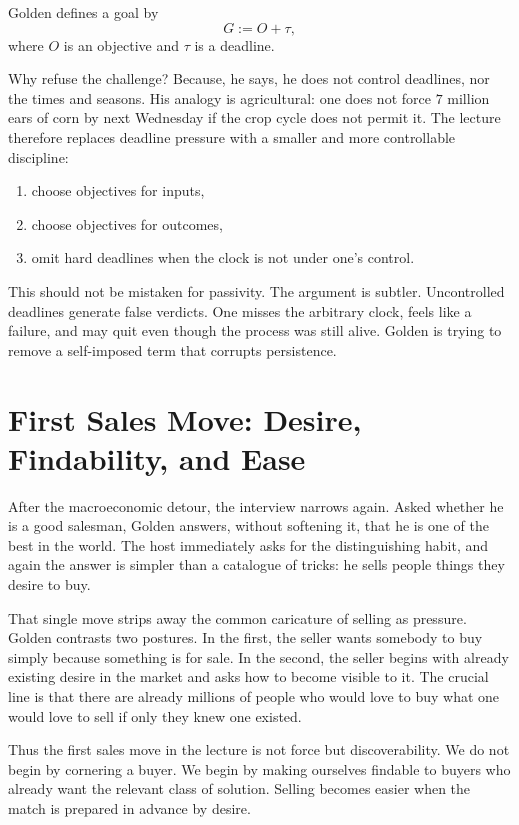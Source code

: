 \begin{definition}
Golden defines a goal by
\begin{equation}
G := O+\tau,
\end{equation}
where \(O\) is an objective and \(\tau\) is a deadline.
\end{definition}

Why refuse the challenge? Because, he says, he does not control deadlines, nor the times and seasons. His analogy is agricultural: one does not force \(7\) million ears of corn by next Wednesday if the crop cycle does not permit it. The lecture therefore replaces deadline pressure with a smaller and more controllable discipline:
\begin{enumerate}
\item choose objectives for inputs,
\item choose objectives for outcomes,
\item omit hard deadlines when the clock is not under one's control.
\end{enumerate}

This should not be mistaken for passivity. The argument is subtler. Uncontrolled deadlines generate false verdicts. One misses the arbitrary clock, feels like a failure, and may quit even though the process was still alive. Golden is trying to remove a self-imposed term that corrupts persistence.

\section{First Sales Move: Desire, Findability, and Ease}

After the macroeconomic detour, the interview narrows again. Asked whether he is a good salesman, Golden answers, without softening it, that he is one of the best in the world. The host immediately asks for the distinguishing habit, and again the answer is simpler than a catalogue of tricks: he sells people things they desire to buy.

That single move strips away the common caricature of selling as pressure. Golden contrasts two postures. In the first, the seller wants somebody to buy simply because something is for sale. In the second, the seller begins with already existing desire in the market and asks how to become visible to it. The crucial line is that there are already millions of people who would love to buy what one would love to sell if only they knew one existed.

Thus the first sales move in the lecture is not force but discoverability. We do not begin by cornering a buyer. We begin by making ourselves findable to buyers who already want the relevant class of solution. Selling becomes easier when the match is prepared in advance by desire.

